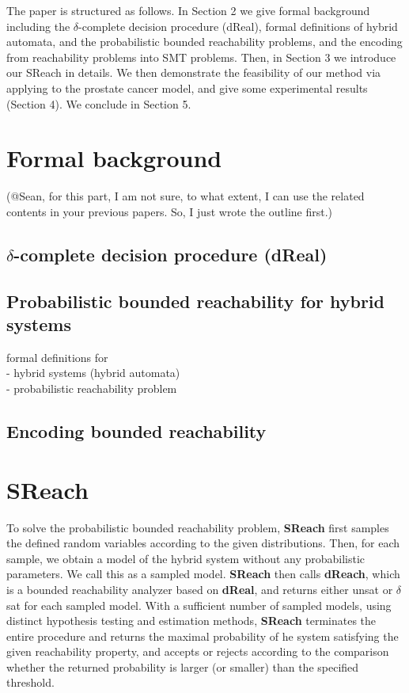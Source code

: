 \documentclass[runningheads,a4paper]{llncs}
\begin{document}
The paper is structured as follows. In Section 2 we give formal background including the $\delta$-complete decision procedure (dReal), formal definitions of hybrid automata, and the probabilistic bounded reachability problems, and the encoding from reachability problems into SMT problems. Then, in Section 3 we introduce our SReach in details. We then demonstrate the feasibility of our method via applying to the prostate cancer model, and give some experimental results (Section 4). We conclude in Section 5.


\section{Formal background}
(@Sean, for this part, I am not sure, to what extent, I can use the related contents in your previous papers. So, I just wrote the outline first.)\\

\subsection{$\delta$-complete decision procedure (dReal)}

\subsection{Probabilistic bounded reachability for hybrid systems}
formal definitions for\\
- hybrid systems (hybrid automata)\\
- probabilistic reachability problem

\subsection{Encoding bounded reachability}



\section{SReach}

To solve the probabilistic bounded reachability problem, {\bf SReach} first samples the defined random variables according to the given distributions. Then, for each sample, we obtain a model of the hybrid system without any probabilistic parameters. We call this as a sampled model. {\bf SReach} then calls {\bf dReach}, which is a bounded reachability analyzer based on {\bf dReal}, and returns either unsat or $\delta$ sat for each sampled model. With a sufficient number of sampled models, using distinct hypothesis testing and estimation methods, {\bf SReach} terminates the entire procedure and returns the maximal probability of he system satisfying the given reachability property, and accepts or rejects according to the comparison whether the returned probability is larger (or smaller) than the specified threshold.
\end{document}
